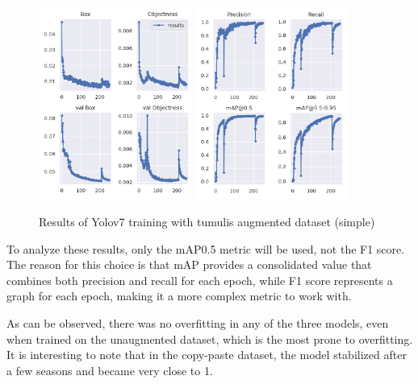 \begin{figure}[H]
    \centering
    {{\includegraphics[width=5cm]{images/training/mamoas/maia1.png} }}
    \qquad
    {{\includegraphics[width=5cm]{images/training/mamoas/maia2.png} }}
    \caption{Results of Yolov7 training with tumulis augmented dataset (simple)}
    \label{Results of Yolov7 training with tumulis augmented dataset (simple)}
\end{figure}

To analyze these results, only the mAP0.5 metric will be used, not the F1 score. The reason for this choice is that mAP provides a consolidated value that combines both precision and recall for each epoch, while F1 score represents a graph for each epoch, making it a more complex metric to work with.

As can be observed, there was no overfitting in any of the three models, even when trained on the unaugmented dataset, which is the most prone to overfitting. It is interesting to note that in the copy-paste dataset, the model stabilized after a few seasons and became very close to 1.

